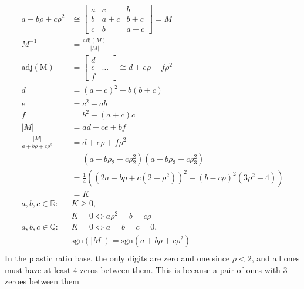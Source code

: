 \documentclass{article}
\begin{document}
\begin{align*}
  a+b\rho+c\rho^2 &\cong
  \begin{bmatrix}
    a & c & b \\
    b & a+c & b+c \\
    c & b & a+c
  \end{bmatrix} = M \\
  M^{-1} &= \frac{\mathrm{adj}(M)}{\lvert M \rvert} \\
  \mathrm{adj(M)} &=
  \begin{bmatrix}
    d & \\
    e & \hdots \\
    f &
  \end{bmatrix}
  \cong d+e\rho+f\rho^2 \\
  d &=
  (a+c)^2-b(b+c) \\
  e &=
  c^2-ab \\
  f &=
  b^2-(a+c)c \\
  \lvert M \rvert &= ad+ce+bf \\
  \frac{\lvert M \rvert}{a+b\rho+c\rho^2}
  &= d+e\rho+f\rho^2 \\
  &= (a+b\rho_2+c\rho_2^2)(a+b\rho_3+c\rho_3^2) \\
  &= \frac{1}{4}\left((2a-b\rho+c(2-\rho^2))^2+(b-c\rho)^2(3\rho^2-4)\right) \\
  &= K \\
  a, b, c \in \mathbb{R}: & K \geq 0, \\
  & K = 0 \iff a\rho^2 = b = c\rho \\
  a, b, c \in \mathbb{Q}: & K = 0 \iff a = b = c = 0, \\
  & \mathrm{sgn}(\lvert M \rvert) = \mathrm{sgn}(a+b\rho+c\rho^2) \\
\end{align*}
In the plastic ratio base,
the only digits are zero and one since $\rho < 2$,
and all ones must have at least 4 zeros between them.
This is because a pair of ones with 3 zeroes between them
\end{document}

